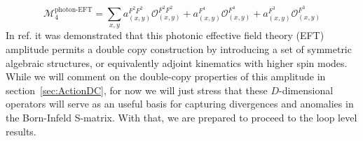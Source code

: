 \documentclass[12pt,letter]{article}
\def\sect#1{section~\ref{#1}}
\begin{document}
\begin{equation}
\boxed{\mathcal{M}^{\text{photon-EFT}}_4 = \sum_{x,y} a_{(x,y)}^{F^2F^2}\mathcal{O}^{F^2F^2}_{(x,y)}+a_{(x,y)}^{F^4}\mathcal{O}^{F^4}_{(x,y)}+a_{(x,y)}^{F^3}\mathcal{O}^{F^3}_{(x,y)}}
\end{equation}
In ref. \cite{Carrasco:2022jxn} it was demonstrated that this photonic effective field theory (EFT) amplitude permits a double copy construction by introducing a set of symmetric algebraic structures, or equivalently adjoint kinematics with higher spin modes. While we will comment on the double-copy properties of this amplitude in \sect{sec:ActionDC}, for now we will just stress that these $D$-dimensional operators will serve as an useful basis for capturing divergences and anomalies in the Born-Infeld S-matrix. With that, we are prepared to proceed to the loop level results. 
\end{document}
